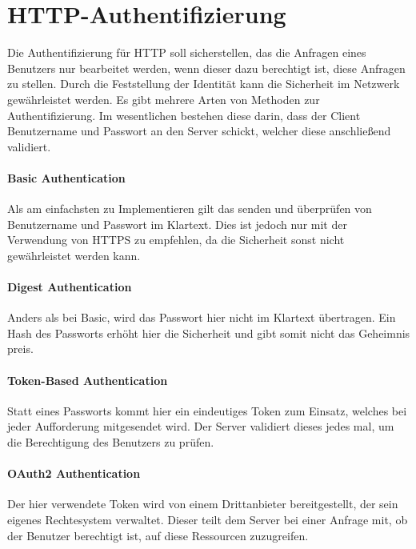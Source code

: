 \section{HTTP-Authentifizierung}
Die Authentifizierung für HTTP soll sicherstellen, das die Anfragen eines Benutzers nur bearbeitet werden, wenn dieser dazu berechtigt ist, diese Anfragen zu stellen. Durch die Feststellung der Identität kann die Sicherheit im Netzwerk gewährleistet werden. Es gibt mehrere Arten von Methoden zur Authentifizierung. Im wesentlichen bestehen diese darin, dass der Client Benutzername und Passwort an den Server schickt, welcher diese anschließend validiert.

\paragraph{Basic Authentication}

Als am einfachsten zu Implementieren gilt das senden und überprüfen von Benutzername und Passwort im Klartext. Dies ist jedoch nur mit der Verwendung von HTTPS zu empfehlen, da die Sicherheit sonst nicht gewährleistet werden kann.

\paragraph{Digest Authentication}

Anders als bei Basic, wird das Passwort hier nicht im Klartext übertragen. Ein Hash des Passworts erhöht hier die Sicherheit und gibt somit nicht das Geheimnis preis.

\paragraph{Token-Based Authentication}

Statt eines Passworts kommt hier ein eindeutiges Token zum Einsatz, welches bei jeder Aufforderung mitgesendet wird. Der Server validiert dieses jedes mal, um die Berechtigung des Benutzers zu prüfen.

\paragraph{OAuth2 Authentication}

Der hier verwendete Token wird von einem Drittanbieter bereitgestellt, der sein eigenes Rechtesystem verwaltet. Dieser teilt dem Server bei einer Anfrage mit, ob der Benutzer berechtigt ist, auf diese Ressourcen zuzugreifen.

